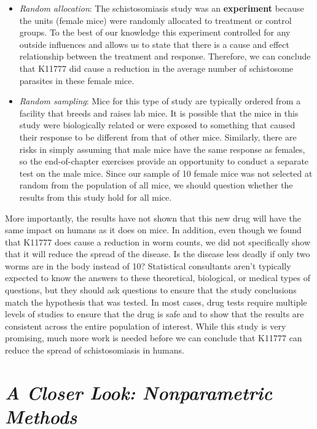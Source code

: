 \documentclass[
]{report}
\begin{document}
\begin{itemize}
\item
  \emph{Random allocation}: The schistosomiasis study was an \textbf{experiment} because the units (female mice) were randomly allocated to treatment or control groups. To the best of our knowledge this experiment controlled for any outside influences and allows us to state that there is a cause and effect relationship between the treatment and response. Therefore, we can conclude that K11777 did cause a reduction in the average number of schistosome parasites in these female mice.
\item
  \emph{Random sampling}: Mice for this type of study are typically ordered from a facility that breeds and raises lab mice. It is possible that the mice in this study were biologically related or were exposed to something that caused their response to be different from that of other mice. Similarly, there are risks in simply assuming
  that male mice have the same response as females, so the end-of-chapter exercises provide an opportunity to conduct a separate test on the male mice. Since our sample of 10 female mice was not selected at random from the population of all mice, we should question whether the results from this study hold for all mice.
\end{itemize}

More importantly, the results have not shown that this new drug will have the same impact on humans as it does on mice. In addition, even though we found that K11777 does cause a reduction in worm counts, we did not specifically show that it will reduce the spread of the disease. Is the disease less deadly if only two worms are in the body instead of 10? Statistical consultants aren't typically expected to know the answers to
these theoretical, biological, or medical types of questions, but they should ask questions to ensure that the study conclusions match the hypothesis that was tested. In most cases, drug tests require multiple levels of studies to ensure that the drug is safe and to show that the results are consistent across the entire population of
interest. While this study is very promising, much more work is needed before we can conclude that K11777 can reduce the spread of schistosomiasis in humans.

\hypertarget{a-closer-look-nonparametric-methods}{%
\section*{\texorpdfstring{\emph{A Closer Look: Nonparametric Methods}}{A Closer Look: Nonparametric Methods}}\label{a-closer-look-nonparametric-methods}}
\end{document}
